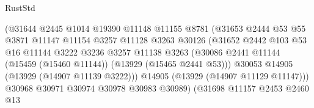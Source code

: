 \begin{lexlean}{RustStd}
\begin{coremodule}
                                        (@31644
                                          @2445
                                          @1014
                                          @19390
                                          @11148
                                          @11155
                                          @8781
                                          (@31653
                                            @2444
                                            @53
                                            @55
                                            @3871
                                            @11147
                                            @11154
                                            @3257
                                            @11128
                                            @3263
                                            @30126
                                            (@31652
                                              @2442
                                              @103
                                              @53
                                              @16
                                              @11144
                                              @3222
                                              @3236
                                              @3257
                                              @11138
                                              @3263
                                              (@30086
                                                @2441
                                                @11144
                                                (@15459 (@15460 @11144))
                                                (@13929 (@15465 @2441 @53)))
                                              @30053
                                              @14905
                                              (@13929 (@14907 @11139 @3222)))
                                            @14905
                                            (@13929 (@14907 @11129 @11147)))
                                          @30968
                                          @30971
                                          @30974
                                          @30978
                                          @30983
                                          @30989)
                                        (@31698
                                          @11157
                                          @2453
                                          @2460
                                          @13

\end{coremodule}
\end{lexlean}

